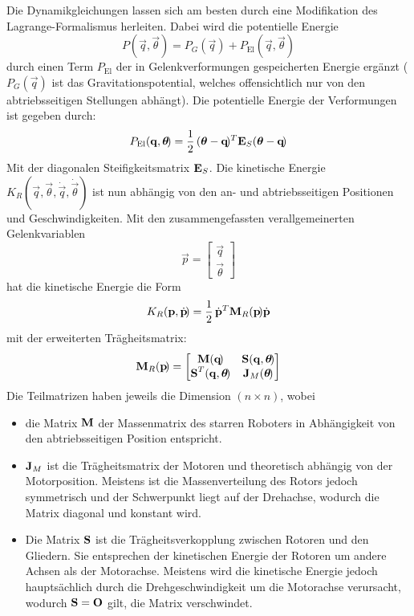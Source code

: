 				Die Dynamikgleichungen lassen sich am besten durch eine Modifikation des Lagrange-Formalismus herleiten. Dabei wird die potentielle Energie
				\begin{equation*}
					P(\vec{q}, \vec{\theta}\!) = P_G(\vec{q}\!) + P_\text{El}(\vec{q}, \vec{\theta}\!)
				\end{equation*}
				durch einen Term \( P_\text{El} \) der in Gelenkverformungen gespeicherten Energie ergänzt (\(P_G(\vec{q}\!)\) ist das Gravitationspotential, welches offensichtlich nur von den abtriebsseitigen Stellungen abhängt). Die potentielle Energie der Verformungen ist gegeben durch:
				\begin{equation*}
					P_\text{El}(\boldsymbol{\mathrm{q}}, \boldsymbol{\mathrm{\theta}}\!) = \frac{1}{2} \, (\boldsymbol{\mathrm{\theta}} - \boldsymbol{\mathrm{q}}\!)^T \boldsymbol{\mathrm{E}}_S (\boldsymbol{\mathrm{\theta}} - \boldsymbol{\mathrm{q}}\!)
				\end{equation*}
				Mit der diagonalen Steifigkeitsmatrix \( \boldsymbol{\mathrm{E}}_S \). Die kinetische Energie \( K_R(\vec{q}, \vec{\theta}, \dot{\vec{q}}, \dot{\vec{\theta}}\!) \) ist nun abhängig von den an- und abtriebsseitigen Positionen und Geschwindigkeiten. Mit den zusammengefassten verallgemeinerten Gelenkvariablen
				\begin{equation*}
					\vec{p} =
						\begin{bmatrix}
							\vec{q} \\
							\vec{\theta}
						\end{bmatrix}
				\end{equation*}
				hat die kinetische Energie die Form
				\begin{equation*}
					K_R(\boldsymbol{\mathrm{p}}, \dot{\boldsymbol{\mathrm{p}}}\!) = \frac{1}{2} \, \dot{\boldsymbol{\mathrm{p}}}^T \boldsymbol{\mathrm{M}}_R(\boldsymbol{\mathrm{p}}\!) \dot{\boldsymbol{\mathrm{p}}}
				\end{equation*}
				mit der erweiterten Trägheitsmatrix:
				\begin{equation*}
					\boldsymbol{\mathrm{M}}_R(\boldsymbol{\mathrm{p}}\!) =
						\begin{bmatrix}
							\boldsymbol{\mathrm{M}}(\boldsymbol{\mathrm{q}}\!)                 & \boldsymbol{\mathrm{S}}(\boldsymbol{\mathrm{q}}, \boldsymbol{\mathrm{\theta}}\!) \\
							\boldsymbol{\mathrm{S}}^T(\boldsymbol{\mathrm{q}}, \boldsymbol{\mathrm{\theta}}\!) & \boldsymbol{\mathrm{J}}_M(\boldsymbol{\mathrm{\theta}}\!)
						\end{bmatrix}
				\end{equation*}
				Die Teilmatrizen haben jeweils die Dimension \( (n \times n) \), wobei
				\begin{itemize}
					\item die Matrix \( \boldsymbol{\mathrm{M}} \) der Massenmatrix des starren Roboters in Abhängigkeit von den abtriebsseitigen Position entspricht.
					\item \( \boldsymbol{\mathrm{J}}_M \) ist die Trägheitsmatrix der Motoren und theoretisch abhängig von der Motorposition. Meistens ist die Massenverteilung des Rotors jedoch symmetrisch und der Schwerpunkt liegt auf der Drehachse, wodurch die Matrix diagonal und konstant wird.
					\item Die Matrix \( \boldsymbol{\mathrm{S}} \) ist die Trägheitsverkopplung zwischen Rotoren und den Gliedern. Sie entsprechen der kinetischen Energie der Rotoren um andere Achsen als der Motorachse. Meistens wird die kinetische Energie jedoch hauptsächlich durch die Drehgeschwindigkeit um die Motorachse verursacht, wodurch \( \boldsymbol{\mathrm{S}} = \boldsymbol{\mathrm{O}} \) gilt, \dh die Matrix verschwindet.
				\end{itemize}
